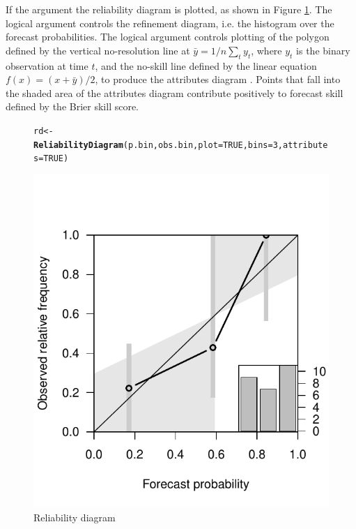 \documentclass[article]{jss}\usepackage{graphicx, color}
\makeatletter
\def\maxwidth{ %
  \ifdim\Gin@nat@width>\linewidth
    \linewidth
  \else
    \Gin@nat@width
  \fi
}
\newcommand{\hlfunctioncall}[1]{\textcolor[rgb]{0,0.501960784313725,0.752941176470588}{\textbf{#1}}}%
\newenvironment{kframe}{%
 \def\at@end@of@kframe{}%
 \ifinner\ifhmode%
  \def\at@end@of@kframe{\end{minipage}}%
  \begin{minipage}{\columnwidth}%
 \fi\fi%
 \def\FrameCommand##1{\hskip\@totalleftmargin \hskip-\fboxsep
 \colorbox{shadecolor}{##1}\hskip-\fboxsep
     \hskip-\linewidth \hskip-\@totalleftmargin \hskip\columnwidth}%
 \MakeFramed {\advance\hsize-\width
   \@totalleftmargin\z@ \linewidth\hsize
   \@setminipage}}%
 {\par\unskip\endMakeFramed%
 \at@end@of@kframe}
\newenvironment{knitrout}{}{} %
\makeatother
\begin{document}
If the argument  the reliability diagram is plotted, as shown in Figure \ref{reldiag-plot}. 
The logical argument  controls the refinement diagram, i.e. the histogram over the forecast probabilities.
The logical argument  controls plotting of the polygon defined by the vertical no-resolution line at $\bar{y} = 1/n \sum_t y_t$, where $y_t$ is the binary observation at time $t$, and the no-skill line defined by the linear equation $f(x)=(x+\bar{y})/2$, to produce the attributes diagram \citep{hsu1986attributes}.
Points that fall into the shaded area of the attributes diagram contribute positively to forecast skill defined by the Brier skill score.

\begin{figure}
\begin{center}
%
\begin{knitrout}
\color{fgcolor}\begin{kframe}
\begin{alltt}
rd <- \hlfunctioncall{ReliabilityDiagram}(p.bin, obs.bin, plot=TRUE, bins=3, attributes=TRUE)
\end{alltt}
\end{kframe}
\includegraphics[width=\maxwidth]{figure/reldiag} 

\end{knitrout}

%
\end{center}
\caption{Reliability diagram}
\label{reldiag-plot}
\end{figure}
\end{document}
